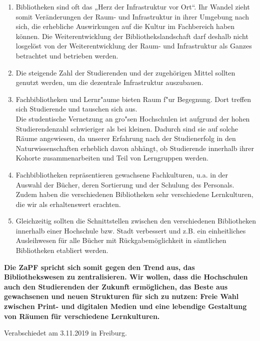 \documentclass[DIV=calc]{scrartcl}
\begin{document}
\begin{enumerate}
\item Bibliotheken sind oft das „Herz der Infrastruktur vor Ort“.
Ihr Wandel zieht somit Veränderungen der Raum- und Infrastruktur in ihrer Umgebung nach sich, die erhebliche Auswirkungen auf die Kultur im Fachbereich haben können.
Die Weiterentwicklung der Bibliothekslandschaft darf deshalb nicht losgelöst von der Weiterentwicklung der Raum- und Infrastruktur als Ganzes betrachtet und betrieben werden.
\item Die steigende Zahl der Studierenden und der zugehörigen Mittel sollten genutzt werden, um die dezentrale Infrastruktur auszubauen.
\item Fachbibliotheken und Lernr"aume bieten Raum f"ur Begegnung.
Dort treffen sich Studierende und tauschen sich aus.\\
Die studentische Vernetzung an gro"sen Hochschulen ist aufgrund der hohen Studierendenzahl schwieriger als bei kleinen.
Dadurch sind sie auf solche Räume angewiesen, da unserer Erfahrung nach der Studienerfolg in den Naturwissenschaften erheblich davon abhängt, ob Studierende innerhalb ihrer Kohorte zusammenarbeiten und Teil von Lerngruppen werden.
\item Fachbibliotheken repräsentieren gewachsene Fachkulturen, u.a. in der Auswahl der Bücher, deren Sortierung und der Schulung des Personals.
Zudem haben die verschiedenen Bibliotheken sehr verschiedene Lernkulturen, die wir als erhaltenswert erachten.
\item Gleichzeitig sollten die Schnittstellen zwischen den verschiedenen Bibliotheken innerhalb einer Hochschule bzw. Stadt verbessert und z.B. ein einheitliches Ausleihwesen für alle Bücher mit Rückgabemöglichkeit in sämtlichen Bibliotheken etabliert werden.
\end{enumerate}

\textbf{Die ZaPF spricht sich somit gegen den Trend aus, das Bibliothekswesen zu zentralisieren.
Wir wollen, dass die Hochschulen auch den Studierenden der Zukunft ermöglichen, das Beste aus gewachsenen und neuen Strukturen für sich zu nutzen:
Freie Wahl zwischen Print- und digitalen Medien und eine lebendige Gestaltung von Räumen für verschiedene Lernkulturen.}
\vfill
    \begin{flushright}
        Verabschiedet am 3.11.2019 in Freiburg.
    \end{flushright}
\end{document}
